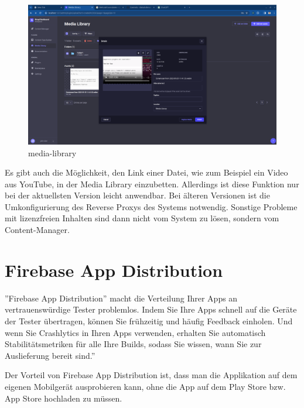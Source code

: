 \begin{figure}[H]
  \centering
  \includegraphics[width=\textwidth]{./pics/media-library.png}
  \caption{media-library}

\end{figure}

Es gibt auch die Möglichkeit, den Link einer Datei, wie zum Beispiel ein Video aus YouTube, in der Media Library 
einzubetten. Allerdings ist diese Funktion nur bei der aktuellsten Version leicht anwendbar. Bei älteren Versionen 
ist die Umkonfigurierung des Reverse Proxys des Systems notwendig. Sonstige Probleme mit lizenzfreien Inhalten 
sind dann nicht vom System zu lösen, sondern vom Content-Manager.
\cite{url-upload-problem}





\section{Firebase App Distribution}

''Firebase App Distribution'' macht die Verteilung
Ihrer Apps an vertrauenswürdige Tester problemlos. Indem Sie Ihre Apps schnell
auf die Geräte der Tester übertragen, können Sie frühzeitig und häufig
Feedback einholen.
Und wenn Sie Crashlytics in Ihren Apps verwenden, erhalten Sie automatisch Stabilitätsmetriken für alle Ihre Builds, sodass Sie wissen, wann Sie zur Auslieferung bereit sind.''\cite{fire-base-app-distribution}

Der Vorteil von Firebase App Distribution ist,
dass man die Applikation auf dem eigenen Mobilgerät ausprobieren kann,
ohne die App auf dem Play Store bzw. App Store hochladen zu müssen.